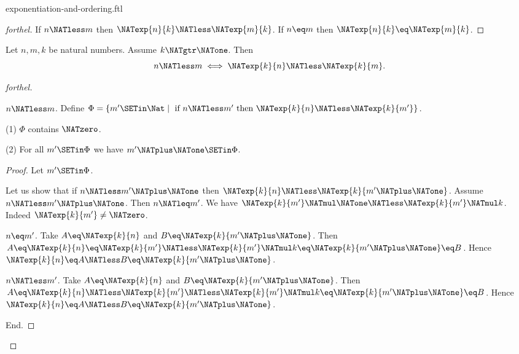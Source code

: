 \documentclass{naproche-library}
\begin{document}
\begin{smodule}[title=Exponentiation and Ordering]{exponentiation-and-ordering.ftl}
\begin{proof}[forthel]
  If $n \NATless m$ then $\NATexp{n}{k} \NATless \NATexp{m}{k}$.
  If $n \eq m$ then $\NATexp{n}{k} \eq \NATexp{m}{k}$.
\end{proof}

\begin{proposition}[forthel,id=ARITHMETIC_09_3349764703780864]
  Let $n, m, k$ be natural numbers.
  Assume $k \NATgtr \NATone$.
  Then \[ n \NATless m \iff \NATexp{k}{n} \NATless \NATexp{k}{m}. \]
\end{proposition}
\begin{proof}[forthel]
  \begin{case}{$n \NATless m$.}
    Define $\Phi = \{ m' \SETin \Nat \mid\text{ if }n \NATless m'\text{ then }\NATexp{k}{n} \NATless \NATexp{k}{m'} \}$.

    (1) $\Phi$ contains $\NATzero$.

    (2) For all $m' \SETin \Phi$ we have $m' \NATplus \NATone \SETin \Phi$.
    \begin{proof}
      Let $m' \SETin \Phi$.

      Let us show that if $n \NATless m' \NATplus \NATone$ then $\NATexp{k}{n} \NATless \NATexp{k}{m' \NATplus \NATone}$.
        Assume $n \NATless m' \NATplus \NATone$.
        Then $n \NATleq m'$.
        We have $\NATexp{k}{m'} \NATmul \NATone \NATless \NATexp{k}{m'} \NATmul k$.
        Indeed $\NATexp{k}{m'} \neq \NATzero$.

        \begin{case}{$n \eq m'$.}
          Take $A \eq \NATexp{k}{n}$ and $B \eq \NATexp{k}{m' \NATplus \NATone}$. %
          Then $A
            \eq \NATexp{k}{n}
            \eq \NATexp{k}{m'}
            \NATless \NATexp{k}{m'} \NATmul k
            \eq \NATexp{k}{m' \NATplus \NATone}
            \eq B$.
          Hence $\NATexp{k}{n} \eq A \NATless B \eq \NATexp{k}{m' \NATplus \NATone}$.
        \end{case}

        \begin{case}{$n \NATless m'$.}
          Take $A \eq \NATexp{k}{n}$ and $B \eq \NATexp{k}{m' \NATplus \NATone}$. %
          Then $A
            \eq \NATexp{k}{n}
            \NATless \NATexp{k}{m'}
            \NATless \NATexp{k}{m'} \NATmul k
            \eq \NATexp{k}{m' \NATplus \NATone}
            \eq B$.
          Hence $\NATexp{k}{n} \eq A \NATless B \eq \NATexp{k}{m' \NATplus \NATone}$.
        \end{case}
      End.
    \end{proof}


\end{case}
\end{proof}
\end{smodule}
\end{document}
